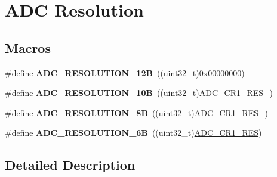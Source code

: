 \hypertarget{group___a_d_c___resolution}{}\section{A\+DC Resolution}
\label{group___a_d_c___resolution}
\subsection*{Macros}
\begin{DoxyCompactItemize}
\item 
\#define {\bfseries A\+D\+C\+\_\+\+R\+E\+S\+O\+L\+U\+T\+I\+O\+N\+\_\+12B}~((uint32\+\_\+t)0x00000000)\hypertarget{group___a_d_c___resolution_ga49c8408a1cdbf97bbf29234c3770fa74}{}\label{group___a_d_c___resolution_ga49c8408a1cdbf97bbf29234c3770fa74}

\item 
\#define {\bfseries A\+D\+C\+\_\+\+R\+E\+S\+O\+L\+U\+T\+I\+O\+N\+\_\+10B}~((uint32\+\_\+t)\hyperlink{group___peripheral___registers___bits___definition_gacfc432ddbd2140a92d877f6d9dc52417}{A\+D\+C\+\_\+\+C\+R1\+\_\+\+R\+E\+S\+\_})\hypertarget{group___a_d_c___resolution_ga91289e269eb3080d25301909c0f417e5}{}\label{group___a_d_c___resolution_ga91289e269eb3080d25301909c0f417e5}

\item 
\#define {\bfseries A\+D\+C\+\_\+\+R\+E\+S\+O\+L\+U\+T\+I\+O\+N\+\_\+8B}~((uint32\+\_\+t)\hyperlink{group___peripheral___registers___bits___definition_ga674904864f540043692a5b5ead9fae10}{A\+D\+C\+\_\+\+C\+R1\+\_\+\+R\+E\+S\+\_})\hypertarget{group___a_d_c___resolution_ga39925af93719877bdcc5664e4b95e69a}{}\label{group___a_d_c___resolution_ga39925af93719877bdcc5664e4b95e69a}

\item 
\#define {\bfseries A\+D\+C\+\_\+\+R\+E\+S\+O\+L\+U\+T\+I\+O\+N\+\_\+6B}~((uint32\+\_\+t)\hyperlink{group___peripheral___registers___bits___definition_ga71e4a4c233895a2e7b6dd3ca6ca849e5}{A\+D\+C\+\_\+\+C\+R1\+\_\+\+R\+ES})\hypertarget{group___a_d_c___resolution_ga24c5226e05db78b4065f2f187d497b04}{}\label{group___a_d_c___resolution_ga24c5226e05db78b4065f2f187d497b04}

\end{DoxyCompactItemize}


\subsection{Detailed Description}

